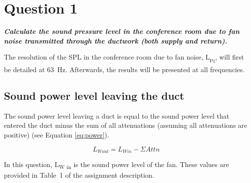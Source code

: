 \section{Question 1}

\textbf{\textit{Calculate the sound pressure level in the conference room due to fan noise transmitted through the ductwork (both supply and return).}}


The resolution of the SPL in the conference room due to fan noise, L\textsubscript{p\textsubscript{1}}, will first be detailed at 63~Hz.
Afterwards, the results will be presented at all frequencies.


\subsection{Sound power level leaving the duct}

The sound power level leaving a duct is equal to the sound power level that entered the duct minus the sum of all attenuations (assuming all attenuations are positive) (see Equation \ref{eq:power}).

    \begin{equation}\label{eq:power}
		L_{W out} = L_{W in} - \Sigma Attn
	\end{equation}
	
In this question, L\textsubscript{W in} is the sound power level of the fan.
These values are provided in Table~1 of the assignment description.

